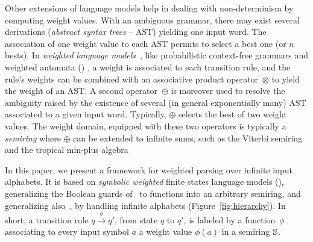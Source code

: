 Other extensions of language models  %
help in dealing with non-determinism by computing weight values.
With an ambiguous grammar, 
there may exist several derivations
(\emph{abstract syntax trees} -- AST) %
yielding one input word. %
The association of one weight value %
to each AST permits to select a best one (or $n$ bests). %
In \emph{weighted language models}~\cite{Goodman99SemiringParsing,Nederhof03weightedParsing,MorbitzVogler19weighted-parsing},
like \eg probabilistic context-free grammars %
and weighted automata (\WA) \cite{Droste09handbook},
a weight is associated to each transition rule, %
and the rule's weights can be combined with an
associative product operator~$\otimes$ to yield the weight of an AST.
A second operator~$\oplus$
is moreover used to resolve the ambiguity raised by the existence
of several (in general exponentially many) AST
associated to a given input word.
Typically, $\oplus$  selects the best of two weight values.
The weight domain, equipped with these two operators is typically 
a \emph{semiring} %
where $\oplus$ can be extended to infinite sums,
such as the Viterbi semiring and the tropical min-plus algebra%

In this paper, we present 
a framework for weighted parsing over infinite input alphabets.
It is based on \emph{symbolic weighted} finite states language models (\swM),
generalizing the Boolean guards of~\SA %
to functions into an arbitrary semiring,
and generalizing also~\WA, by handling infinite alphabets (Figure~\ref{fig:hierarchy}).
%
In short, a transition rule $q \xrightarrow{\phi} q'$, from state $q$ to $q'$,
is labeled by a function~$\phi$ associating to every input symbol $a$ a weight value $\phi(a)$
in a semiring $\mathbb{S}$.

